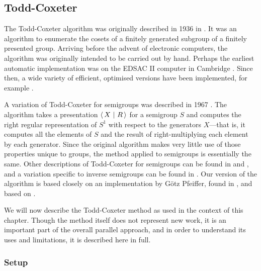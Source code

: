 \subsection{Todd-Coxeter}
\label{sec:tc}

The Todd-Coxeter algorithm was originally described in 1936 in
\cite{todd_coxeter_1936}.  It was an algorithm to enumerate the cosets of a
finitely generated subgroup of a finitely presented group.  Arriving before the
advent of electronic computers, the algorithm was originally intended to be
carried out by hand.  Perhaps the earliest automatic implementation was on the
EDSAC II computer in Cambridge \cite{leech_1963}.  Since then, a wide variety of
efficient, optimised versions have been implemented, for example \cite{ace}.

A variation of Todd-Coxeter for semigroups was described in 1967
\cite{neumann_1967}.  The algorithm takes a presentation $\left\langle\,X ~\middle|~ R\,\right\rangle$
for a semigroup $S$ and computes the right regular representation of $S^1$ with
respect to the generators $X$---that is, it computes all the elements of $S$ and
the result of right-multiplying each element by each generator.  Since the
original algorithm makes very little use of those properties unique to groups,
the method applied to semigroups is essentially the same.  Other descriptions of
Todd-Coxeter for semigroups can be found in \cite[Chapter 12]{ruskuc_thesis} and
\cite[Chapter 1.2]{walker_thesis}, and a variation specific to inverse
semigroups can be found in \cite{cutting_thesis}.  Our version of the algorithm
is based closely on an implementation by G\"otz Pfeiffer, found in
\cite[\texttt{lib/tcsemi.gi}]{gap}, and based on \cite{walker_thesis}.

We will now describe the Todd-Coxeter method as used in the context of this
chapter.  Though the method itself does not represent new work, it is an
important part of the overall parallel approach, and in order to understand its
uses and limitations, it is described here in full.

\subsubsection{Setup}

